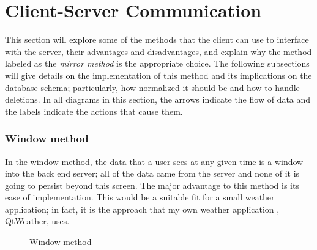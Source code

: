\section{Client-Server Communication} \label{sec:communication}






This section will explore some of the methods that the client can use to
interface with the server, their advantages and disadvantages, and explain why
the method labeled as the \textit{mirror method} is the appropriate choice. The
following subsections will give details on the implementation of this method and
its implications on the database schema; particularly, how normalized it should
be and how to handle deletions. In all diagrams in this section, the arrows
indicate the flow of data and the labels indicate the actions that cause them.


\subsubsection{Window method}

In the window method, the data that a user sees at any given time is a window
into the back end server; all of the data came from the server and none of it is
going to persist beyond this screen. The major advantage to this method is its
ease of implementation. This would be a suitable fit for a small weather
application; in fact, it is the approach that my own weather application ,
QtWeather, uses.  


\begin{figure}[h!]
\centering
{}
\caption{Window method}
\label{fig:window}
\end{figure}


